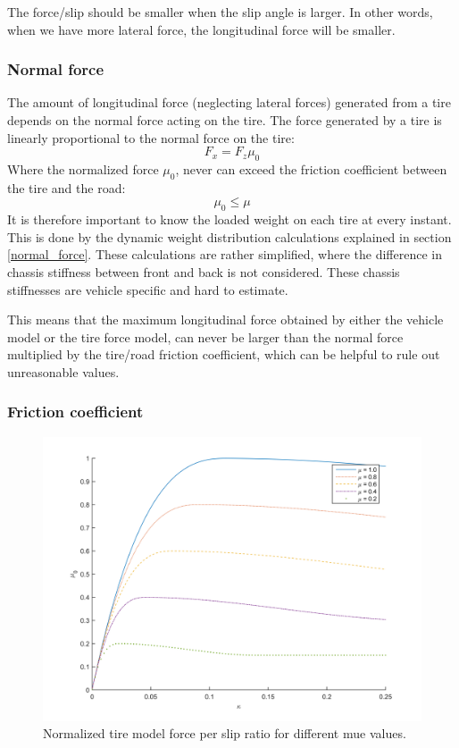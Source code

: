  The force/slip should be smaller when the slip angle is larger. In other words, when we have more lateral force, the longitudinal force will be smaller.

\subsubsection{Normal force}
The amount of longitudinal force (neglecting lateral forces) generated from a tire depends on the normal force acting on the tire. The force generated by a tire is linearly proportional to the normal force on the tire:
\begin{equation}
	F_{x} = F_{z}\mu_{0}
\end{equation}
Where the normalized force $ \mu_{0} $, never can exceed the friction coefficient between the tire and the road:
\begin{equation}
	\mu_{0} \leq \mu
\end{equation}
It is therefore important to know the loaded weight on each tire at every instant. This is done by the dynamic weight distribution calculations explained in section \ref{normal_force}. These calculations are rather simplified, where the difference in chassis stiffness between front and back is not considered. These chassis stiffnesses are vehicle specific and hard to estimate. 

This means that the maximum longitudinal force obtained by either the vehicle model or the tire force model, can never be larger than the normal force multiplied by the tire/road friction coefficient, which can be helpful to rule out unreasonable values. 

\subsubsection{Friction coefficient}
\label{section_friction coefficient}

\begin{figure}[h]
	\centering
	\includegraphics[width=1.0\textwidth]{Pictures/slipkraft_olika_mue}
	\caption {Normalized tire model force per slip ratio for different mue values.}
	\label{different_mue}
\end{figure}

